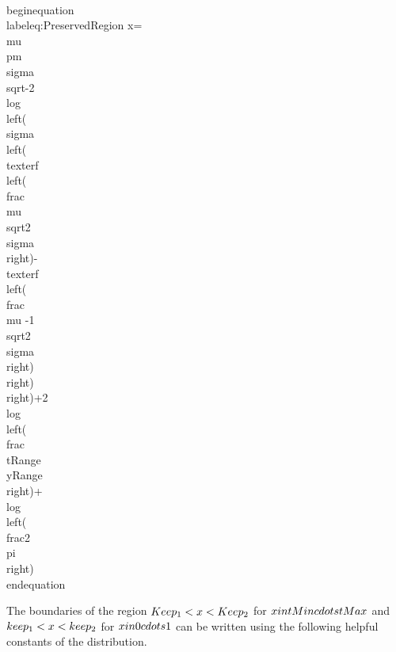 \\begin{equation}\\label{eq:PreservedRegion}
 x=\\mu \\pm \\sigma  \\sqrt{-2 \\log \\left(\\sigma  \\left(\\text{erf}\\left(\\frac{\\mu }{\\sqrt{2} \\sigma }\\right)-\\text{erf}\\left(\\frac{\\mu -1}{\\sqrt{2} \\sigma }\\right)\\right)\\right)+2 \\log \\left(\\frac{\\tRange}{\\yRange}\\right)+\\log \\left(\\frac{2}{\\pi }\\right)}
\\end{equation}


The boundaries of the region $\\Keep_1 < x < \\Keep_2$ for $x \\in \\{\\tMin \\cdots \\tMax \\}$ and $\\keep_1 < x < \\keep_2$ for $x \\in \\{0 \\cdots 1 \\}$ can be written using the following helpful constants of the distribution.

